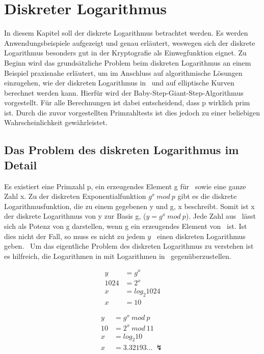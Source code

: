 \section{Diskreter Logarithmus}\label{Kapitel Diskreter Logarithmus}
	In diesem Kapitel soll der diskrete Logarithmus betrachtet werden. Es werden Anwendungsbeispiele aufgezeigt und genau erläutert, weswegen sich der diskrete Logarithmus besonders gut in der Kryptografie als Einwegfunktion eignet. Zu Beginn wird das grundsätzliche Problem beim diskreten Logarithmus an einem Beispiel praxisnahe erläutert, um im Anschluss auf algorithmische Lösungen einzugehen, wie der diskreten Logarithmus in \myZPStern~und auf elliptische Kurven berechnet werden kann. Hierfür wird der Baby-Step-Giant-Step-Algorithmus vorgestellt. Für alle Berechnungen ist dabei entscheidend, dass p wirklich prim ist. Durch die zuvor vorgestellten Primzahltests ist dies jedoch zu einer beliebigen Wahrscheinlichkeit gewährleistet.  

	\subsection{Das Problem des diskreten Logarithmus im Detail}\label{Das Problem des diskreten Logarithmus im Detail}
		Es existiert eine Primzahl p, ein erzeugendes Element g für \myZPStern~sowie eine ganze Zahl x. Zu der diskreten Exponentialfunktion $g^x~mod~p$ gibt es die diskrete Logarithmusfunktion, die zu einem gegebenen y und g, x beschreibt. Somit ist x der diskrete Logarithmus von y zur Basis g, ($y = g^x~mod~p$). Jede Zahl aus \myZPStern~lässt sich als Potenz von g darstellen, wenn g ein erzeugendes Element von \myZPStern~ist. Ist dies nicht der Fall, so muss es nicht zu jedem $y$ \myin \myZPStern~einen diskreten Logarithmus geben.~\cite{Kryptografie:in:Theorie:und:Praxis} Um das eigentliche Problem des diskreten Logarithmus zu verstehen ist es hilfreich, die Logarithmen in  mit Logarithmen in \myZPStern~gegenüberzustellen.
		\begin{minipage}{0.24\textwidth}
			\begin{equation}
			\begin{aligned}
			y &= g^x\\
			1024 &= 2^x\\
			x &= log_2 1024\\
			x &= 10
			\end{aligned}
			\label{Gleichung Log in Z}
			\end{equation}
		\end{minipage}
		\begin{minipage}{0.24\textwidth}
			\begin{equation}
			\begin{aligned}
			y &= g^x~mod~p\\
			10 &= 2^x~mod~11\\
			x &= log_2 10\\
			x &= 3.32193...~\lightning
			\end{aligned}
			\label{Gleichung Log in ZP}
			\end{equation}
		\end{minipage}

